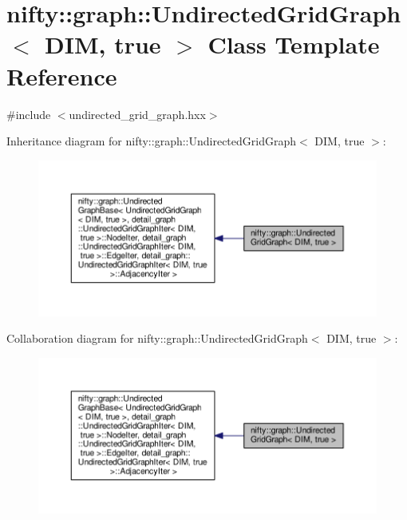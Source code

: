 \hypertarget{classnifty_1_1graph_1_1UndirectedGridGraph_3_01DIM_00_01true_01_4}{}\section{nifty\+:\+:graph\+:\+:Undirected\+Grid\+Graph$<$ D\+I\+M, true $>$ Class Template Reference}
\label{classnifty_1_1graph_1_1UndirectedGridGraph_3_01DIM_00_01true_01_4}


{\ttfamily \#include $<$undirected\+\_\+grid\+\_\+graph.\+hxx$>$}



Inheritance diagram for nifty\+:\+:graph\+:\+:Undirected\+Grid\+Graph$<$ D\+I\+M, true $>$\+:\nopagebreak
\begin{figure}[H]
\begin{center}
\leavevmode
\includegraphics[width=350pt]{classnifty_1_1graph_1_1UndirectedGridGraph_3_01DIM_00_01true_01_4__inherit__graph}
\end{center}
\end{figure}


Collaboration diagram for nifty\+:\+:graph\+:\+:Undirected\+Grid\+Graph$<$ D\+I\+M, true $>$\+:\nopagebreak
\begin{figure}[H]
\begin{center}
\leavevmode
\includegraphics[width=350pt]{classnifty_1_1graph_1_1UndirectedGridGraph_3_01DIM_00_01true_01_4__coll__graph}
\end{center}
\end{figure}
